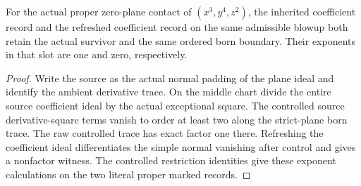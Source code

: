 \begin{theorem}
\label{hir:g1-proper-inherited-refreshed-born-mismatch}
\leanok
For the actual proper zero-plane contact of $(x^3,y^4,z^2)$,
the inherited coefficient record and the refreshed coefficient
record on the same admissible blowup both retain the actual
survivor and the same ordered born boundary. Their exponents
in that slot are one and zero, respectively.
\end{theorem}
\begin{proof}
Write the source as the actual normal padding of the plane
ideal and identify the ambient derivative trace. On the middle
chart divide the entire source coefficient ideal by the actual
exceptional square. The controlled source derivative-square
terms vanish to order at least two along the strict-plane born
trace. The raw controlled trace has exact factor one there.
Refreshing the coefficient ideal differentiates the simple
normal vanishing after control and gives a nonfactor witness.
The controlled restriction identities give these exponent
calculations on the two literal proper marked records.
\end{proof}


